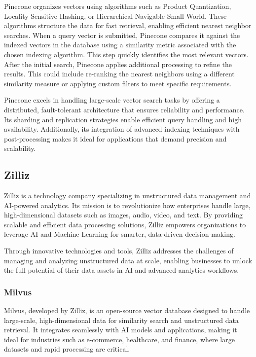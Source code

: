 Pinecone organizes vectors using algorithms such as Product Quantization, Locality-Sensitive Hashing, or Hierarchical Navigable Small World. 
These algorithms structure the data for fast retrieval, enabling efficient nearest neighbor searches.
When a query vector is submitted, Pinecone compares it against the indexed vectors in the database using a similarity metric associated with the chosen indexing algorithm.
 This step quickly identifies the most relevant vectors.
After the initial search, Pinecone applies additional processing to refine the results. 
This could include re-ranking the nearest neighbors using a different similarity measure or applying custom filters to meet specific requirements.

Pinecone excels in handling large-scale vector search tasks by offering a distributed, fault-tolerant architecture that ensures reliability and performance. 
Its sharding and replication strategies enable efficient query handling and high availability.
Additionally, its integration of advanced indexing techniques with post-processing makes it ideal for applications that demand precision and scalability.

\subsection{Zilliz}
Zilliz is a technology company specializing in unstructured data management and AI-powered analytics. 
Its mission is to revolutionize how enterprises handle large, high-dimensional datasets such as images, audio, video, and text. 
By providing scalable and efficient data processing solutions, Zilliz empowers organizations to leverage AI and Machine Learning for smarter, data-driven decision-making.

Through innovative technologies and tools, Zilliz addresses the challenges of managing and analyzing unstructured data at scale, enabling businesses to unlock the full potential of their data assets in AI and advanced analytics workflows.

\subsubsection{Milvus}
Milvus, developed by Zilliz, is an open-source vector database designed to handle large-scale, high-dimensional data for similarity search and unstructured data retrieval. It integrates seamlessly with AI models and applications, making it ideal for industries such as e-commerce, healthcare, and finance, where large datasets and rapid processing are critical.

